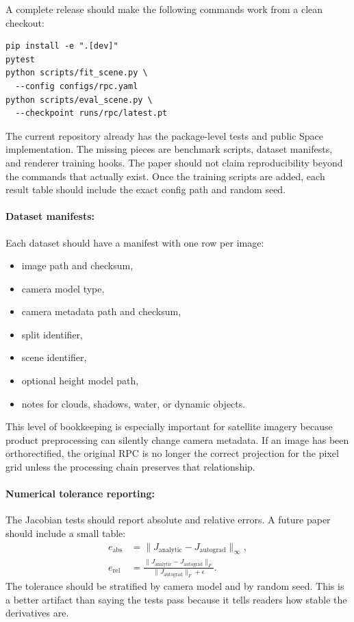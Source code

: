\documentclass{article}
\begin{document}
A complete release should make the following commands work from a clean checkout:
\begin{verbatim}
pip install -e ".[dev]"
pytest
python scripts/fit_scene.py \
  --config configs/rpc.yaml
python scripts/eval_scene.py \
  --checkpoint runs/rpc/latest.pt
\end{verbatim}
The current repository already has the package-level tests and public Space implementation. The missing pieces are benchmark scripts, dataset manifests, and renderer training hooks. The paper should not claim reproducibility beyond the commands that actually exist. Once the training scripts are added, each result table should include the exact config path and random seed.

\paragraph{Dataset manifests:}

Each dataset should have a manifest with one row per image:
\begin{itemize}
  \item image path and checksum,
  \item camera model type,
  \item camera metadata path and checksum,
  \item split identifier,
  \item scene identifier,
  \item optional height model path,
  \item notes for clouds, shadows, water, or dynamic objects.
\end{itemize}
This level of bookkeeping is especially important for satellite imagery because product preprocessing can silently change camera metadata. If an image has been orthorectified, the original RPC is no longer the correct projection for the pixel grid unless the processing chain preserves that relationship.

\paragraph{Numerical tolerance reporting:}

The Jacobian tests should report absolute and relative errors. A future paper should include a small table:
\begin{equation}
\begin{aligned}
e_{\text{abs}}&=\|J_{\text{analytic}}-J_{\text{autograd}}\|_{\infty},\\
e_{\text{rel}}&=\frac{\|J_{\text{analytic}}-J_{\text{autograd}}\|_F}{\|J_{\text{autograd}}\|_F+\epsilon}.
\end{aligned}
\end{equation}
The tolerance should be stratified by camera model and by random seed. This is a better artifact than saying the tests pass because it tells readers how stable the derivatives are.
\end{document}
